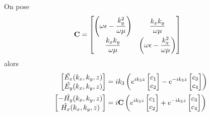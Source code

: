    \begin{prop}
        On pose
        \begin{align}
            \mathbf{C} &=
            \begin{bmatrix}
                \left(\omega\epsilon-\dfrac{k_y^2}{\omega\mu}\right) & \dfrac{k_xk_y}{\omega\mu}\\
                \dfrac{k_xk_y}{\omega\mu} & \left(\omega\epsilon-\dfrac{k_x^2}{\omega\mu}\right)
            \end{bmatrix}
        \end{align}
        alors
        \begin{subequations}
            \label{eq:imp_fourier:plan:champs}
            \begin{align}
                \begin{bmatrix}
                    \hat{E_x}(k_x,k_y,z)\\
                    \hat{E_y}(k_x,k_y,z)\\
                \end{bmatrix}
                &=ik_3\left( e^{ik_3 z}
                \begin{bmatrix}
                    c_1 \\
                    c_2
                \end{bmatrix}
                -e^{-ik_3 z}
                \begin{bmatrix}
                    c_3 \\
                    c_4
                \end{bmatrix}
                \right)
                \label{eq:imp_fourier:plan:champs:E}
                \\
                \begin{bmatrix}
                    -\hat{H_y}(k_x,k_y,z)\\
                    \hat{H_x}(k_x,k_y,z)\\
                \end{bmatrix}
                &=i
                \mathbf{C}
                \left(
                    e^{ik_3 z}
                    \begin{bmatrix}
                        c_1 \\
                        c_2
                    \end{bmatrix}
                    +e^{-ik_3 z}
                    \begin{bmatrix}
                        c_3 \\
                        c_4
                    \end{bmatrix}
                \right)
                \label{eq:imp_fourier:plan:champs:H}
            \end{align}
        \end{subequations}
    \end{prop}

